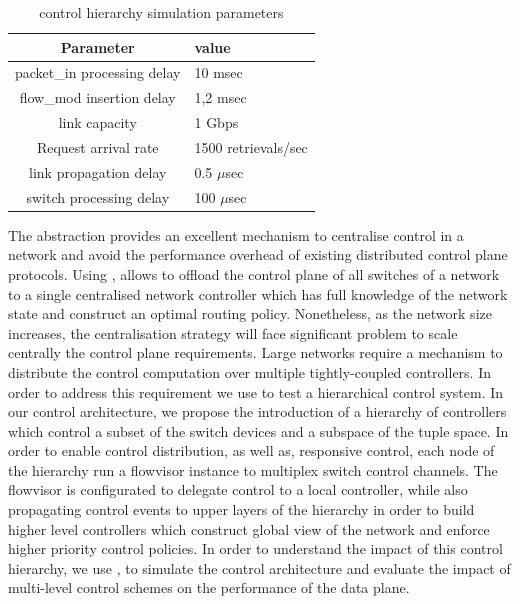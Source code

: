 
\begin{table}
\begin{center}
\begin{tabular}{|c| l |} \hline
  Parameter & value \\ \hline
  packet\_in processing delay & 10 msec \\ \hline
  flow\_mod insertion delay & 1,2 msec \\ \hline
  link capacity & 1 Gbps \\ \hline
  Request arrival rate & 1500 retrievals/sec \\ \hline
  link propagation delay & 0.5 $\mu$sec \\ \hline
  switch processing delay & 100 $\mu$sec \\ \hline
\end{tabular}
\end{center}
\label{tbl:sdnsim_experiment_parameters}
\caption{control hierarchy simulation parameters}
\end{table}

The \of abstraction provides an excellent mechanism to centralise control in a
network and avoid the performance overhead of existing distributed control plane
protocols. Using \of, allows to offload the control plane of all switches of a
network to a single centralised network controller which has full knowledge of
the network state and construct an optimal routing policy.  Nonetheless, as the
network size increases, the centralisation strategy will face significant
problem to scale centrally the control plane requirements.  Large networks
require a mechanism to distribute the control computation over multiple
tightly-coupled controllers. In order to address this requirement we use \sdnsim
to test a hierarchical control system. In our control architecture, we propose
the introduction of a hierarchy of controllers which control a subset of the
switch devices and a subspace of the \of tuple space. In order to enable control
distribution, as well as, responsive control, each node of the hierarchy run a
flowvisor instance to multiplex switch control channels. The flowvisor is
configurated to delegate control to a local controller, while also propagating
control events to upper layers of the hierarchy in order to build higher level
controllers which construct global view of the network and enforce higher
priority control policies. In order to understand the impact of this control
hierarchy, we use \sdnsim, to simulate the control architecture and evaluate the
impact of multi-level control schemes on the performance of the data plane. 

